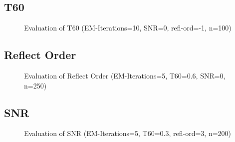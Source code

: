 \subsection*{T60}
\begin{figure}[H]
    \centering
    \begin{subfigure}{0.49\textwidth}
          \centering
	       
%            
	\end{subfigure}
    \begin{subfigure}{0.49\textwidth}
          \centering
	       
%            
	\end{subfigure}
\caption{Evaluation of T60 (EM-Iterations=10, SNR=0, refl-ord=-1, n=100)}
\end{figure}

\subsection*{Reflect Order}
\begin{figure}[H]
    \centering
    \begin{subfigure}{0.49\textwidth}
          \centering
	       
%            
	\end{subfigure}
    \begin{subfigure}{0.49\textwidth}
          \centering
	       
%            
	\end{subfigure}
\caption{Evaluation of Reflect Order (EM-Iterations=5, T60=0.6, SNR=0, n=250)}
\end{figure}

\subsection*{SNR}
\begin{figure}[H]
    \centering
    \begin{subfigure}{0.49\textwidth}
          \centering
	       
%            
	\end{subfigure}
    \begin{subfigure}{0.49\textwidth}
          \centering
	       
%            
	\end{subfigure}
\caption{Evaluation of SNR (EM-Iterations=5, T60=0.3, refl-ord=3, n=200)}
\end{figure}
